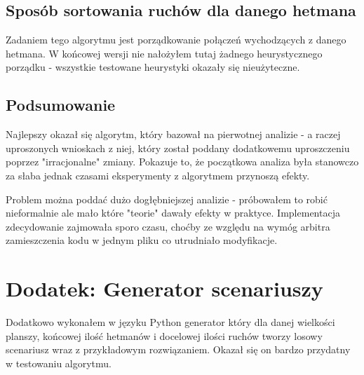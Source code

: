 \documentclass{article}
\begin{document}
\subsection{Sposób sortowania ruchów dla danego hetmana}

Zadaniem tego algorytmu jest porządkowanie połączeń wychodzących z danego hetmana. W końcowej wersji nie nałożyłem tutaj żadnego heurystycznego porządku - wszystkie testowane heurystyki okazały się nieużyteczne.

\subsection{Podsumowanie}

Najlepszy okazał się algorytm, który bazował na pierwotnej analizie - a raczej uproszonych wnioskach z niej, który został poddany dodatkowemu uproszczeniu poprzez "irracjonalne" zmiany. Pokazuje to, że początkowa analiza była stanowczo za słaba jednak czasami eksperymenty z algorytmem przynoszą efekty.

Problem można poddać dużo dogłębniejszej analizie - próbowałem to robić nieformalnie ale mało które "teorie" dawały efekty w praktyce. Implementacja zdecydowanie zajmowała sporo czasu, choćby ze względu na wymóg arbitra  zamieszczenia kodu w jednym pliku co utrudniało modyfikacje.

\section{Dodatek: Generator scenariuszy}

Dodatkowo wykonałem w języku Python generator który dla danej wielkości planszy, końcowej ilość hetmanów i docelowej ilości ruchów tworzy losowy scenariusz wraz z przykładowym rozwiązaniem. Okazał się on bardzo przydatny w testowaniu algorytmu. 
\end{document}

